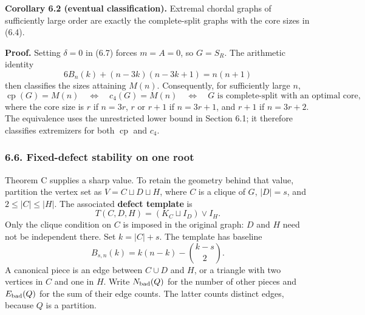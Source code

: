 \documentclass[english,11pt,a4paper]{article}
\begin{document}

\textbf{Corollary 6.2 (eventual classification).} Extremal chordal graphs of sufficiently large order are exactly the complete-split graphs with the core sizes in (6.4).

\textbf{Proof.} Setting \(\delta=0\) in (6.7) forces \(m=A=0\), so \(G=S_R\). The arithmetic identity \[
6B_n(k)+(n-3k)(n-3k+1)=n(n+1)
\tag{6.8}
\] then classifies the sizes attaining \(M(n)\). Consequently, for sufficiently large \(n\), \[
\operatorname{cp}(G)=M(n)
\quad\Longleftrightarrow\quad
c_4(G)=M(n)
\quad\Longleftrightarrow\quad
G\text{ is complete-split with an optimal core},
\tag{6.9}
\] where the core size is \(r\) if \(n=3r\), \(r\) or \(r+1\) if \(n=3r+1\), and \(r+1\) if \(n=3r+2\). The equivalence uses the unrestricted lower bound in Section 6.1; it therefore classifies extremizers for both \(\operatorname{cp}\) and \(c_4\).

\subsubsection{6.6. Fixed-defect stability on one root}\label{fixed-defect-stability-on-one-root}

Theorem C supplies a sharp value. To retain the geometry behind that value, partition the vertex set as \(V=C\sqcup D\sqcup H\), where \(C\) is a clique of \(G\), \(|D|=s\), and \(2\le |C|\le |H|\). The associated \textbf{defect template} is \[
T(C,D,H)=(K_C\sqcup I_D)\vee I_H.
\] Only the clique condition on \(C\) is imposed in the original graph: \(D\) and \(H\) need not be independent there. Set \(k=|C|+s\). The template has baseline \[
B_{s,n}(k)=k(n-k)-\binom{k-s}{2}.
\tag{6.10}
\] A canonical piece is an edge between \(C\cup D\) and \(H\), or a triangle with two vertices in \(C\) and one in \(H\). Write \(N_{\rm bad}(Q)\) for the number of other pieces and \(E_{\rm bad}(Q)\) for the sum of their edge counts. The latter counts distinct edges, because \(Q\) is a partition.
\end{document}
